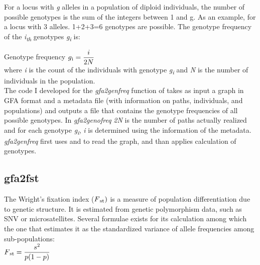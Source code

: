 For a locus with \emph{g} alleles in a population of diploid individuals, the number of possible genotypes is the sum of the integers between 1 and g. As an example, for a locus with 3 alleles. 1+2+3=6 genotypes are possible. The genotype frequency of the \emph{i\textsubscript{th}} genotypes \emph{g\textsubscript{i}} is: 

Genotype frequency    $g\textsubscript{i} = \dfrac{i}{2N}$\\

\noindent
where \emph{i} is the count of the individuals with genotype \emph{g\textsubscript{i}} and \emph{N} is the number of individuals in the population.\\

The code I developed for the \textit{gfa2genfreq} function of \vgp takes as input a graph in GFA format and a metadata file (with information on paths, individuals, and populations) and outputs a file that contains the genotype frequencies of all possible genotypes. In \textit{gfa2genofreq} \emph{2N} is the number of paths actually realized and for each genotype \emph{g\textsubscript{i}}, \emph{i} is determined using the information of the metadata. 
\textit{gfa2genfreq} first uses \bbp and \bbc to read the graph, and than applies calculation of genotypes.




\subsection{gfa2fst}
The Wright’s fixation index ($F\textsubscript{st})$ is a measure of population differentiation due to genetic structure. It is estimated from genetic polymorphism data, such as SNV or microsatellites. Several formulae exists for its calculation among which the one that estimates it as the standardized variance of allele frequencies among sub-populations:\\

$F\textsubscript{st} = \dfrac{s^{2}}{p(1-p)}$\\

